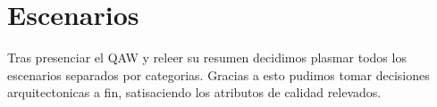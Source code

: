 


\newcommand\escenario[7]{
	\begin{itemize}
		\item \textit{#1}  
		
		\item \textbf{Fuente:} #2
		\item \textbf{Estímulo:} #3
		\item \textbf{Entorno:} #4
		\item \textbf{Artefacto:} #5
		\item \textbf{Respuesta:} #6
		\item \textbf{Medición:} #7
		
		
	\end{itemize}
}








%

\section{Escenarios}

Tras presenciar el QAW y releer su resumen decidimos plasmar todos los escenarios separados por categorias. Gracias a esto pudimos tomar decisiones arquitectonicas a fin, satisaciendo los atributos de calidad relevados.



\bigskip


\bigskip


\bigskip


\bigskip




%

